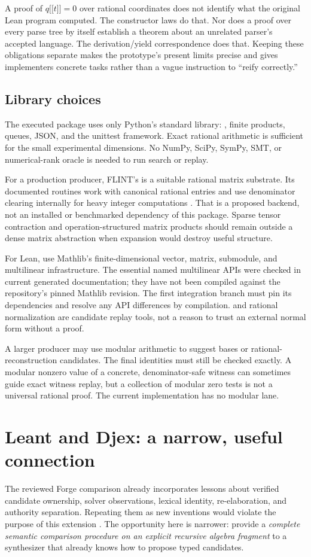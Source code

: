 \documentclass[11pt,letterpaper]{article}
\theoremstyle{definition}\newtheorem{definition}[theorem]{Definition}
\theoremstyle{remark}\newtheorem{remark}[theorem]{Remark}
\newcommand{\eval}[1]{\mathopen{[\![}#1\mathclose{]\!]}}
\newcommand{\code}[1]{\texttt{\detokenize{#1}}}
\begin{document}
A proof of $q\eval t=0$ over rational coordinates does not identify what the original Lean program computed. The constructor laws do that. Nor does a proof over every parse tree by itself establish a theorem about an unrelated parser's accepted language. The derivation/yield correspondence does that. Keeping these obligations separate makes the prototype's present limits precise and gives implementers concrete tasks rather than a vague instruction to ``reify correctly.''

\subsection{Library choices}
The executed package uses only Python's standard library: \code{fractions.Fraction}, finite products, queues, JSON, and the unittest framework. Exact rational arithmetic is sufficient for the small experimental dimensions. No NumPy, SciPy, SymPy, SMT, or numerical-rank oracle is needed to run search or replay.

For a production producer, FLINT's \code{fmpq_mat_t} is a suitable rational matrix substrate. Its documented routines work with canonical rational entries and use denominator clearing internally for heavy integer computations \cite{flint}. That is a proposed backend, not an installed or benchmarked dependency of this package. Sparse tensor contraction and operation-structured matrix products should remain outside a dense matrix abstraction when expansion would destroy useful structure.

For Lean, use Mathlib's finite-dimensional vector, matrix, submodule, and multilinear infrastructure. The essential named multilinear APIs were checked in current generated documentation; they have not been compiled against the repository's pinned Mathlib revision. The first integration branch must pin its dependencies and resolve any API differences by compilation. \code{ring} and rational normalization are candidate replay tools, not a reason to trust an external normal form without a proof.

A larger producer may use modular arithmetic to suggest bases or rational-reconstruction candidates. The final identities must still be checked exactly. A modular nonzero value of a concrete, denominator-safe witness can sometimes guide exact witness replay, but a collection of modular zero tests is not a universal rational proof. The current implementation has no modular lane.

\section{Leant and Djex: a narrow, useful connection}
\label{sec:related}
The reviewed Forge comparison already incorporates lessons about verified candidate ownership, solver observations, lexical identity, re-elaboration, and authority separation. Repeating them as new inventions would violate the purpose of this extension \cite{forge-neighbors}. The opportunity here is narrower: provide a \emph{complete semantic comparison procedure on an explicit recursive algebra fragment} to a synthesizer that already knows how to propose typed candidates.
\end{document}
